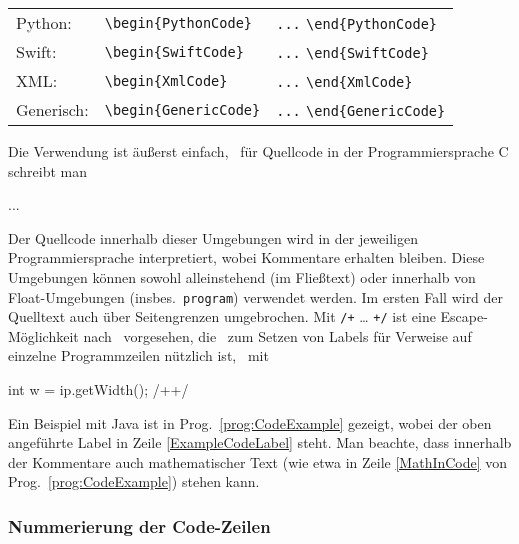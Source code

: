 \begin{table}
\begin{tabular}{@{}lll@{}}
	Python:      & \verb!\begin{PythonCode}!
		& \verb!...! \verb!\end{PythonCode}! \\
	Swift:       & \verb!\begin{SwiftCode}!
		& \verb!...! \verb!\end{SwiftCode}! \\
	XML:         & \verb!\begin{XmlCode}!
		& \verb!...! \verb!\end{XmlCode}! \\
	Generisch:   & \verb!\begin{GenericCode}!
		& \verb!...! \verb!\end{GenericCode}! \\
	\bottomrule
\end{tabular}
\end{table}
%
Die Verwendung ist äußerst einfach, \zB\ für Quellcode in der
Programmiersprache C schreibt man
%
\begin{GenericCode}[numbers=none]
\begin{CCode}
    ... 
\end{CCode}
\end{GenericCode}
%
Der Quellcode innerhalb dieser Umgebungen wird in der jeweiligen
Programmiersprache interpretiert, wobei Kommentare erhalten bleiben. Diese
Umgebungen können sowohl alleinstehend (im Fließtext) oder innerhalb von
Float-Umgebungen (insbes.\ \texttt{program}) verwendet werden. Im ersten Fall
wird der Quelltext auch über Seitengrenzen umgebrochen. Mit \verb!/+! \ldots
\verb!+/! ist eine Escape-Möglichkeit nach \latex\ vorgesehen, die \va\ zum
Setzen von Labels für Verweise auf einzelne Programmzeilen nützlich ist, \zB\
mit
%
\begin{GenericCode}[numbers=none]
int w = ip.getWidth(); /+\label{ExampleCodeLabel}+/
\end{GenericCode}
%
Ein Beispiel mit Java ist in Prog.~\ref{prog:CodeExample} gezeigt, wobei der
oben angeführte Label in Zeile \ref{ExampleCodeLabel} steht. Man beachte,
dass innerhalb der Kommentare auch mathematischer Text (wie etwa in Zeile
\ref{MathInCode} von Prog.~\ref{prog:CodeExample}) stehen kann.


\subsubsection{Nummerierung der Code-Zeilen}

